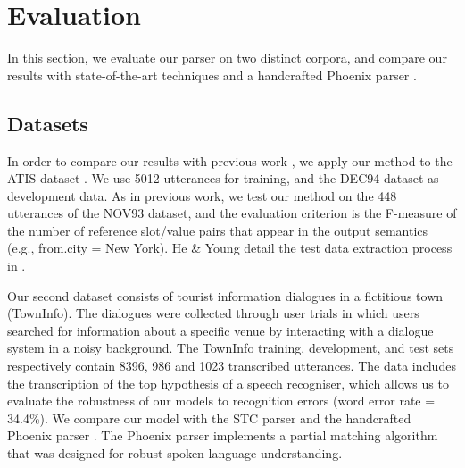 \documentclass{article}
\begin{document}

\section{Evaluation} \label{sec:evaluation}

In this section, we evaluate our parser on two distinct corpora, and compare our results with state-of-the-art techniques and a handcrafted Phoenix parser \cite{ward91}. 

\subsection{Datasets} \label{sec:dataset}

In order to compare our results with previous work \cite{mairesse09, he05,zettlemoyer07,meza08b},
we apply our method to the ATIS  dataset \cite{atis94}. 
We use 5012 utterances for training, and the DEC94 dataset as development data. As in previous work, we test our method on the 448 utterances of the NOV93 dataset, and the evaluation criterion is the F-measure of the number of reference slot/value pairs that appear in the output semantics (e.g., from.city = New York). He \& Young detail the test data extraction process in \cite{he05}.

Our second dataset consists of tourist information dialogues in a fictitious town (TownInfo). The dialogues were collected through user trials in which users searched for information about a specific venue by interacting with a dialogue system in a noisy background. 
The TownInfo training, development, and test sets respectively contain 8396, 986 and 1023 transcribed utterances.  The data includes the transcription of the top hypothesis of a speech recogniser, which allows us to evaluate the robustness of our models to recognition errors (word error rate = 34.4\%). 
We compare our model with the STC parser \cite{mairesse09} and the handcrafted Phoenix parser \cite{ward91}. The Phoenix parser implements a partial matching algorithm that was designed for robust spoken language understanding.
\end{document}
